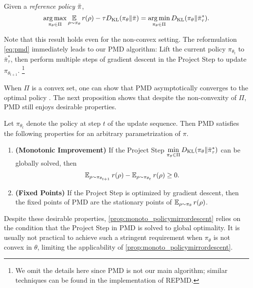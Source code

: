 \begin{prop}
\label{prop:mirrordescent_projection}
Given a \emph{reference policy} $\bar{\pi}$,
{\small
\begin{equation*}
	\operatorname*{arg\,max}\limits_{\pi_\theta \in \Pi} { \operatorname*{\mathbb{E}}\limits_{\rho \sim \pi_\theta}{  r(\rho)  - \tau D_{\mathrm{KL}}(\pi_\theta \| \bar{\pi}) } } 
 = \operatorname*{arg\,min}\limits_{\pi_\theta \in \Pi}{ D_{\mathrm{KL}}(\pi_\theta \| \bar{\pi}_\tau^*) }.
\end{equation*}
}
\end{prop}
Note that this result holds even for the non-convex setting.
%
The reformulation \cref{eq:pmd} immediately leads to our PMD algorithm:
Lift the current policy $\pi_{\theta_t}$ to $\bar{\pi}_\tau^*$,
then perform multiple steps of gradient descent in the Project Step
to update $\pi_{\theta_{t+1}}$.%
%
\footnote{
We omit the details here since PMD is not our main algorithm;
similar techniques can be found in the implementation of REPMD. 
}

When $\Pi$ is a convex set, one can show that PMD asymptotically converges to the optimal policy \citep{nemirovskii1983problem,beck2003mirror}. 
The next proposition shows that despite the non-convexity of $\Pi$,
PMD still enjoys desirable properties.

\begin{prop}
\label{prop:monoto_policymirrordescent}
Let $\pi_{\theta_{t}}$ denote the policy at step $t$ of
the update sequence.
Then PMD satisfies the following properties for an arbitrary 
parametrization of $\pi$.
\begin{enumerate}
	\item {\bf (Monotonic Improvement)} 
	If the Project Step $\min\limits_{\pi_\theta \in \Pi}{D_{\mathrm{KL}}( \pi_\theta \| \bar{\pi}_{\tau}^* )}$ can be globally solved, then
	 \begin{equation*}
	\operatorname{\mathbb{E}}_{\rho \sim \pi_{\theta_{t+1}}}{r(\rho)} - \operatorname{\mathbb{E}}_{\rho \sim \pi_{\theta_{t}}}{  r(\rho)} \ge 0.
	\end{equation*}
	\item {\bf (Fixed Points)} If the Project Step is optimized by gradient descent, then the fixed points of PMD are the 
	 stationary points of $\operatorname{\mathbb{E}}_{\rho \sim \pi_\theta}{  r(\rho)}$. 
\end{enumerate}
\end{prop}
Despite these desirable properties, 
\cref{prop:monoto_policymirrordescent}
relies on the condition that the Project Step in PMD is solved to
global optimality.
It is usually not practical to achieve such a stringent requirement
when $\pi_\theta$ is not convex in $\theta$,
limiting the applicability of \cref{prop:monoto_policymirrordescent}.

